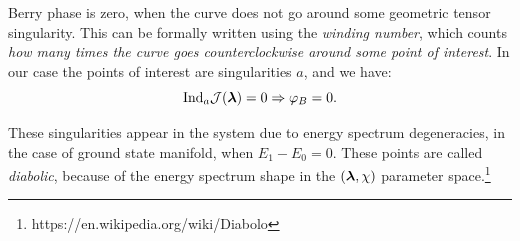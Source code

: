 Berry phase is zero, when the curve does not go around some geometric tensor singularity. This can be formally written using the \emph{winding number}, which counts \emph{how many times the curve goes counterclockwise around some point of interest}. In our case the points of interest are singularities $a$, and we have:
$$\mathrm{Ind}_a \mathcal J({\bm\lambda})=0 \Rightarrow \varphi_B=0.$$

These singularities appear in the system due to energy spectrum degeneracies, in the case of ground state manifold, when $E_1-E_0=0$. These points are called \emph{diabolic}, because of the energy spectrum shape in the $({\bm\lambda},\chi)$ parameter space.\footnote{https://en.wikipedia.org/wiki/Diabolo}
